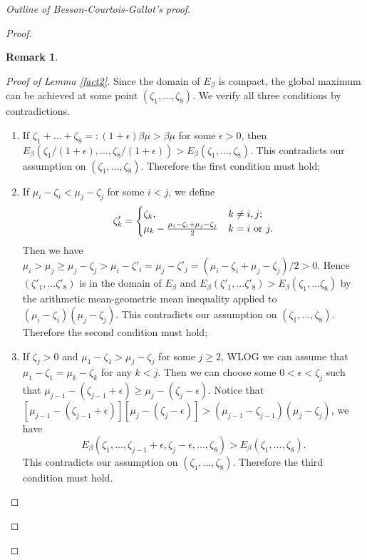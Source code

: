 \documentclass{article}
\theoremstyle{definition}
\newtheorem*{rmk}{Remark}
\begin{document}
\begin{proof}[Outline of Besson-Courtois-Gallot's proof]
\begin{proof}
\begin{rmk}
\end{rmk}
\begin{proof}[Proof of Lemma \ref{fact2}]
Since the domain of $E_\beta$ is compact, the global maximum can be achieved at some point $(\zeta_1,...,\zeta_8)$. We verify all three conditions by contradictions.
\begin{enumerate}
\item[(1).] If $\zeta_1+...+\zeta_8=:(1+\epsilon)\beta\mu>\beta\mu$ for some $\epsilon>0$, then $E_\beta(\zeta_1/(1+\epsilon),...,\zeta_8/(1+\epsilon))>E_\beta(\zeta_1,...,\zeta_8)$. This contradicts our assumption on $(\zeta_1,...,\zeta_8)$. Therefore the first condition must hold;
\item[(2).] If $\mu_i-\zeta_i<\mu_j-\zeta_j$ for some $i<j$, we define
$$\zeta'_k=\begin{cases}\displaystyle \zeta_k,~~&k\neq i,j;\\ \mu_k-\frac{\mu_i-\zeta_i+\mu_j-\zeta_j}{2} &k=i\mathrm{~or~}j.\displaystyle \end{cases}$$
Then we have $\mu_i>\mu_j\geq\mu_j-\zeta_j>\mu_i-\zeta'_i=\mu_j-\zeta'_j=(\mu_i-\zeta_i+\mu_j-\zeta_j)/2>0$. Hence $(\zeta'_1,...\zeta'_8)$ is in the domain of $E_\beta$ and $E_\beta(\zeta'_1,...\zeta'_8)>E_\beta(\zeta_1,...\zeta_8)$ by the arithmetic mean-geometric mean inequality applied to $(\mu_i-\zeta_i)(\mu_j-\zeta_j)$. This contradicts our assumption on $(\zeta_1,...,\zeta_8)$. Therefore the second condition must hold;
\item[(3).] If $\zeta_j> 0$ and $\mu_1-\zeta_1>\mu_j-\zeta_j$ for some $j\geq 2$, WLOG we can assume that $\mu_1-\zeta_1=\mu_k-\zeta_k$ for any $k<j$. Then we can choose some $0<\epsilon<\zeta_j$ such that $\mu_{j-1}-(\zeta_{j-1}+\epsilon)\geq\mu_j-(\zeta_j-\epsilon)$. Notice that
$[\mu_{j-1}-(\zeta_{j-1}+\epsilon)][\mu_j-(\zeta_j-\epsilon)]>(\mu_{j-1}-\zeta_{j-1})(\mu_j-\zeta_j)$, we have
$$E_\beta(\zeta_1,...,\zeta_{j-1}+\epsilon,\zeta_{j}-\epsilon,...,\zeta_8)>E_\beta(\zeta_1,...,\zeta_8).$$ This contradicts our assumption on $(\zeta_1,...,\zeta_8)$. Therefore the third condition must hold. \qedhere
\end{enumerate}
\end{proof}


\end{proof}
\end{proof}
\end{document}

